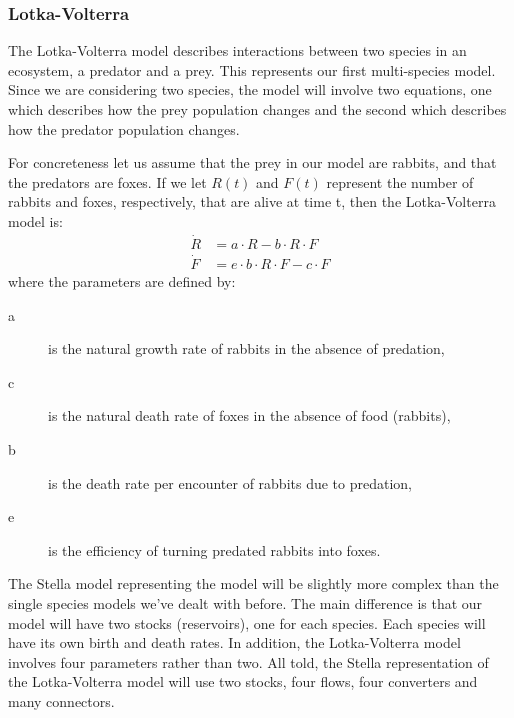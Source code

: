 \documentclass[11pt,english,BCOR10mm,DIV12,bibliography=totoc,parskip=false,smallheadings
    headexclude,footexclude,oneside]{pst-doc}
\begin{document}
\clearpage
\subsubsection{Lotka-Volterra}

The Lotka-Volterra model describes interactions between two species in an ecosystem, a 
predator and a prey. This represents our first multi-species model. Since we are considering 
two species, the model will involve two equations, one which describes how the prey 
population changes and the second which describes how the predator population changes.

For concreteness let us assume that the prey in our model are rabbits, and that the 
predators are foxes. If we let $R(t)$ and $F(t)$ represent the number of rabbits and 
foxes, respectively, that are alive at time t, then the Lotka-Volterra model is:
%
\begin{align}
\dot R &= a\cdot R - b\cdot R\cdot F\\
\dot F &= e\cdot b\cdot R\cdot F - c\cdot F
\end{align}
%
where the parameters are defined by:
\begin{description}
\item[a] is the natural growth rate of rabbits in the absence of predation,
\item[c] is the natural death rate of foxes in the absence of food (rabbits),
\item[b] is the death rate per encounter of rabbits due to predation,
\item[e] is the efficiency of turning predated rabbits into foxes.
\end{description}

The Stella model representing the  model will be slightly more complex than the 
single species models we've dealt with before. The main difference is that our model will have 
two stocks (reservoirs), one for each species. Each species will have its own birth and death 
rates. In addition, the Lotka-Volterra model involves four parameters rather than two. All told, 
the Stella representation of the Lotka-Volterra model will use two stocks, four flows, four 
converters and many connectors.
\end{document}
